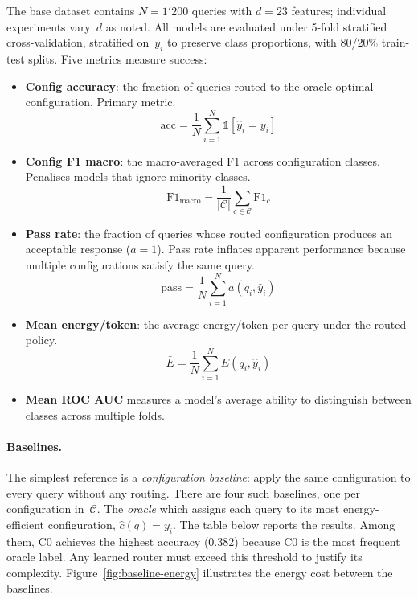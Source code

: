 The base dataset contains $N = 1{'}200$ queries
with $d = 23$ features; individual experiments vary~$d$ as noted.
All models are evaluated under 5-fold stratified cross-validation,
stratified on~$y_i$ to preserve class proportions,
with 80/20\% train-test splits. Five metrics measure success:

\begin{itemize}
    \item \textbf{Config accuracy}: the fraction of queries routed to the oracle-optimal configuration. Primary metric.
          $$\text{acc} = \frac{1}{N} \sum_{i=1}^{N}
          \mathbb{1}[\hat{y}_i = y_i]$$
    \item \textbf{Config F1 macro}: the macro-averaged F1 across configuration classes.  Penalises
          models that ignore minority classes.
          $$\text{F1}_{\text{macro}} = \frac{1}{|\mathcal{C}|}
          \sum_{c \in \mathcal{C}} \text{F1}_c$$
    \item \textbf{Pass rate}: the fraction of queries whose routed configuration produces an
          acceptable response ($a = 1$).  Pass rate inflates apparent
          performance because multiple configurations satisfy the same query.
          $$\text{pass} = \frac{1}{N} \sum_{i=1}^{N}a(q_i, \hat{y}_i)$$
    \item \textbf{Mean energy/token}: the average energy/token per query under the routed policy.
          $$\bar{E} = \frac{1}{N} \sum_{i=1}^{N} E(q_i, \hat{y}_i)$$
    \item \textbf{Mean ROC AUC} measures a model's average ability to distinguish
    between classes across multiple folds. 
\end{itemize}

\paragraph{Baselines.}
The simplest reference is a \emph{configuration baseline}: apply the same
configuration to every query without any routing.
There are four such baselines, one per configuration in~$\mathcal{C}$.
The \emph{oracle} which assigns each query to its most energy-efficient configuration,
$\hat{c}(q) = y_i$. The table below reports the
results.  Among them, C0 achieves the highest accuracy
(0.382) because C0 is the most frequent oracle label.  Any learned router
must exceed this threshold to justify its complexity.
Figure~\ref{fig:baseline-energy} illustrates the energy cost between the baselines.

